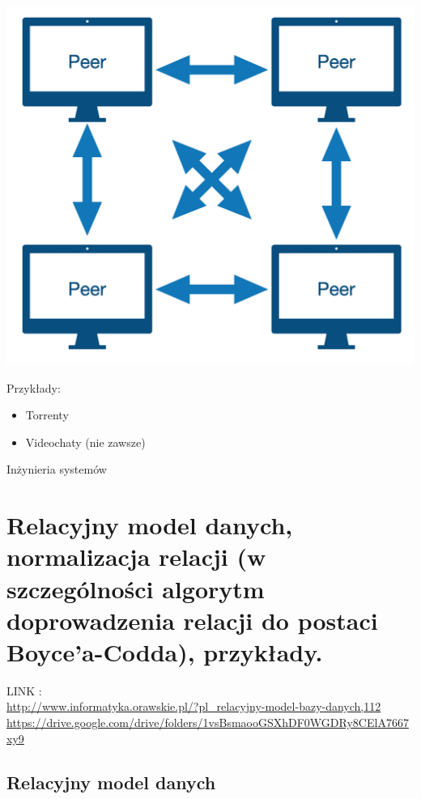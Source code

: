 \documentclass[12pt]{article}
\begin{document}
            \begin{center}
                \includegraphics[scale=0.30]{patterns/peer2peer.png}
            \end{center}

            Przykłady:
            \begin{itemize}
                \item Torrenty
                \item Videochaty (nie zawsze)
            \end{itemize}

    \newpage

    {\Large Inżynieria systemów}

    \section{Relacyjny model danych, normalizacja relacji (w szczególności algorytm doprowadzenia relacji do postaci Boyce’a-Codda), przykłady.}
    
    LINK :\\
    \url{http://www.informatyka.orawskie.pl/?pl_relacyjny-model-bazy-danych,112}
    \url{https://drive.google.com/drive/folders/1vsBsmaooGSXhDF0WGDRy8CElA7667xy9}
    
    \subsection{Relacyjny model danych}
    
\end{document}
